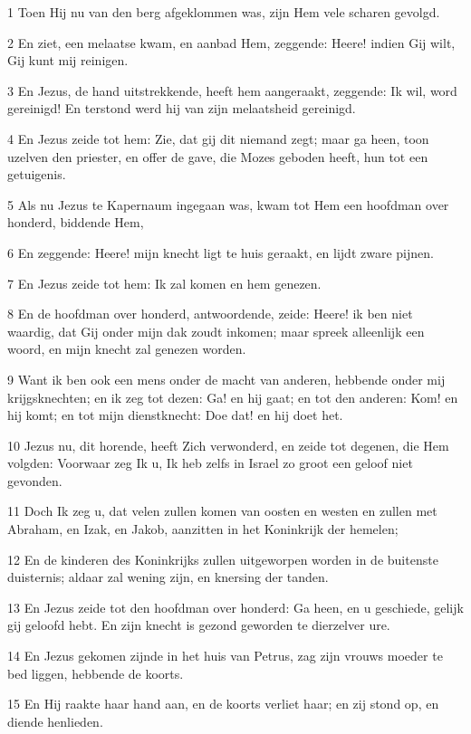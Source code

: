 \par 1 Toen Hij nu van den berg afgeklommen was, zijn Hem vele scharen gevolgd.
\par 2 En ziet, een melaatse kwam, en aanbad Hem, zeggende: Heere! indien Gij wilt, Gij kunt mij reinigen.
\par 3 En Jezus, de hand uitstrekkende, heeft hem aangeraakt, zeggende: Ik wil, word gereinigd! En terstond werd hij van zijn melaatsheid gereinigd.
\par 4 En Jezus zeide tot hem: Zie, dat gij dit niemand zegt; maar ga heen, toon uzelven den priester, en offer de gave, die Mozes geboden heeft, hun tot een getuigenis.
\par 5 Als nu Jezus te Kapernaum ingegaan was, kwam tot Hem een hoofdman over honderd, biddende Hem,
\par 6 En zeggende: Heere! mijn knecht ligt te huis geraakt, en lijdt zware pijnen.
\par 7 En Jezus zeide tot hem: Ik zal komen en hem genezen.
\par 8 En de hoofdman over honderd, antwoordende, zeide: Heere! ik ben niet waardig, dat Gij onder mijn dak zoudt inkomen; maar spreek alleenlijk een woord, en mijn knecht zal genezen worden.
\par 9 Want ik ben ook een mens onder de macht van anderen, hebbende onder mij krijgsknechten; en ik zeg tot dezen: Ga! en hij gaat; en tot den anderen: Kom! en hij komt; en tot mijn dienstknecht: Doe dat! en hij doet het.
\par 10 Jezus nu, dit horende, heeft Zich verwonderd, en zeide tot degenen, die Hem volgden: Voorwaar zeg Ik u, Ik heb zelfs in Israel zo groot een geloof niet gevonden.
\par 11 Doch Ik zeg u, dat velen zullen komen van oosten en westen en zullen met Abraham, en Izak, en Jakob, aanzitten in het Koninkrijk der hemelen;
\par 12 En de kinderen des Koninkrijks zullen uitgeworpen worden in de buitenste duisternis; aldaar zal wening zijn, en knersing der tanden.
\par 13 En Jezus zeide tot den hoofdman over honderd: Ga heen, en u geschiede, gelijk gij geloofd hebt. En zijn knecht is gezond geworden te dierzelver ure.
\par 14 En Jezus gekomen zijnde in het huis van Petrus, zag zijn vrouws moeder te bed liggen, hebbende de koorts.
\par 15 En Hij raakte haar hand aan, en de koorts verliet haar; en zij stond op, en diende henlieden.
